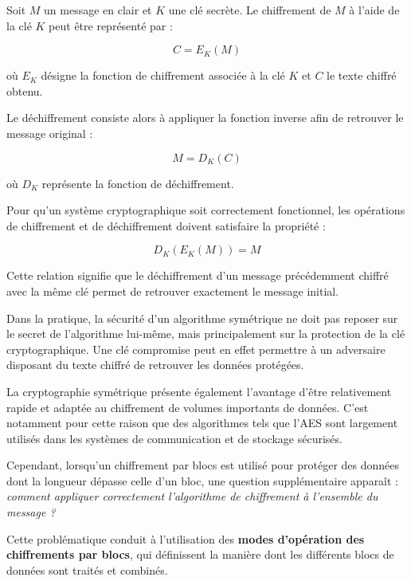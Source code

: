 \documentclass[12pt,a4paper]{article}
\begin{document}
Soit $M$ un message en clair et $K$ une clé secrète. Le chiffrement de $M$ à l'aide de la clé $K$ peut être représenté par :

\begin{equation}
C = E_K(M)
\end{equation}

où $E_K$ désigne la fonction de chiffrement associée à la clé $K$ et $C$ le texte chiffré obtenu.

Le déchiffrement consiste alors à appliquer la fonction inverse afin de retrouver le message original :

\begin{equation}
M = D_K(C)
\end{equation}

où $D_K$ représente la fonction de déchiffrement.

Pour qu'un système cryptographique soit correctement fonctionnel, les opérations de chiffrement et de déchiffrement doivent satisfaire la propriété :

\begin{equation}
D_K(E_K(M)) = M
\end{equation}

Cette relation signifie que le déchiffrement d'un message précédemment chiffré avec la même clé permet de retrouver exactement le message initial.

Dans la pratique, la sécurité d'un algorithme symétrique ne doit pas reposer sur le secret de l'algorithme lui-même, mais principalement sur la protection de la clé cryptographique. Une clé compromise peut en effet permettre à un adversaire disposant du texte chiffré de retrouver les données protégées.

La cryptographie symétrique présente également l'avantage d'être relativement rapide et adaptée au chiffrement de volumes importants de données. C'est notamment pour cette raison que des algorithmes tels que l'AES sont largement utilisés dans les systèmes de communication et de stockage sécurisés.

Cependant, lorsqu'un chiffrement par blocs est utilisé pour protéger des données dont la longueur dépasse celle d'un bloc, une question supplémentaire apparaît : \textit{comment appliquer correctement l'algorithme de chiffrement à l'ensemble du message ?}

Cette problématique conduit à l'utilisation des \textbf{modes d'opération des chiffrements par blocs}, qui définissent la manière dont les différents blocs de données sont traités et combinés.
\end{document}
